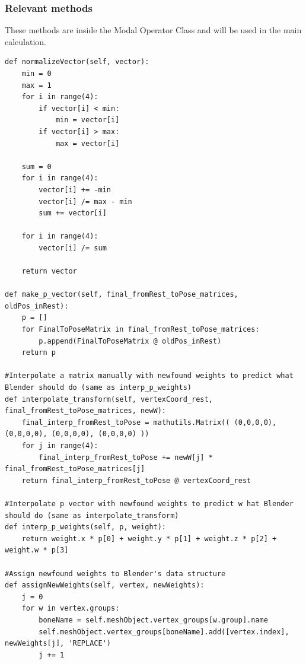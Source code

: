 \documentclass[12pt,twoside]{report}
\begin{document}
\subsubsection{Relevant methods}
These methods are inside the Modal Operator Class and will be used in the main calculation.
\begin{lstlisting}
def normalizeVector(self, vector):
    min = 0
    max = 1
    for i in range(4):
        if vector[i] < min:
            min = vector[i]
        if vector[i] > max:
            max = vector[i]
        
    sum = 0
    for i in range(4):
        vector[i] += -min
        vector[i] /= max - min
        sum += vector[i]
        
    for i in range(4):
        vector[i] /= sum
        
    return vector

def make_p_vector(self, final_fromRest_toPose_matrices, oldPos_inRest):
    p = []
    for FinalToPoseMatrix in final_fromRest_toPose_matrices:
        p.append(FinalToPoseMatrix @ oldPos_inRest)
    return p

#Interpolate a matrix manually with newfound weights to predict what Blender should do (same as interp_p_weights)
def interpolate_transform(self, vertexCoord_rest, final_fromRest_toPose_matrices, newW):
    final_interp_fromRest_toPose = mathutils.Matrix(( (0,0,0,0), (0,0,0,0), (0,0,0,0), (0,0,0,0) ))
    for j in range(4):
        final_interp_fromRest_toPose += newW[j] * final_fromRest_toPose_matrices[j]
    return final_interp_fromRest_toPose @ vertexCoord_rest

#Interpolate p vector with newfound weights to predict w hat Blender should do (same as interpolate_transform)
def interp_p_weights(self, p, weight):
    return weight.x * p[0] + weight.y * p[1] + weight.z * p[2] + weight.w * p[3]

#Assign newfound weights to Blender's data structure
def assignNewWeights(self, vertex, newWeights):
    j = 0
    for w in vertex.groups:
        boneName = self.meshObject.vertex_groups[w.group].name
        self.meshObject.vertex_groups[boneName].add([vertex.index], newWeights[j], 'REPLACE')
        j += 1
\end{lstlisting}
\end{document}

